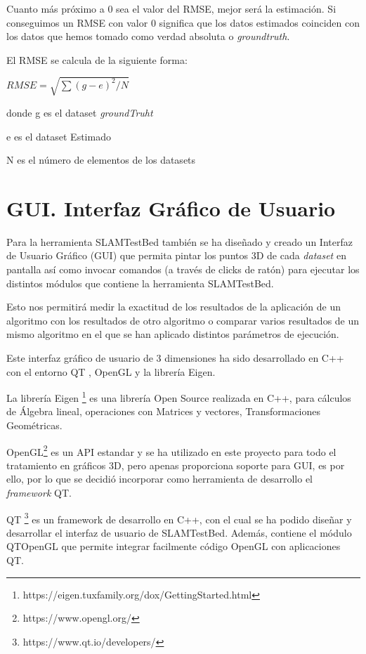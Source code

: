 Cuanto más próximo a 0 sea el valor del RMSE, mejor será la estimación. Si conseguimos un RMSE con valor 0 significa que los datos estimados coinciden con los datos que hemos tomado como verdad absoluta o \textit{groundtruth}.

El RMSE se calcula de la siguiente forma:
\begin{center}
\begin{math}
RMSE =\sqrt{\sum{( g - e)^2}/N}
\end{math}
\end{center}

donde g es el dataset \textit{groundTruht}

      e es el dataset Estimado

      N es el número de elementos de los datasets




\section{GUI. Interfaz Gráfico de Usuario}
Para la herramienta SLAMTestBed también se ha diseñado y creado un Interfaz de Usuario Gráfico (GUI) que permita pintar los puntos 3D de cada \textit{dataset} en pantalla así como invocar comandos (a través de clicks de ratón) para ejecutar los distintos módulos que contiene la herramienta SLAMTestBed.

Esto nos permitirá medir la exactitud de los resultados de la aplicación de un algoritmo con los resultados de otro algoritmo o comparar varios resultados de un mismo algoritmo en el que se han aplicado distintos parámetros de ejecución.

Este interfaz gráfico de usuario de 3 dimensiones ha sido desarrollado en C++ con el entorno QT , OpenGL y la librería Eigen. 

La librería Eigen \footnote{https://eigen.tuxfamily.org/dox/GettingStarted.html} es una librería Open Source realizada en C++, para cálculos de Álgebra lineal, operaciones con Matrices y vectores, Transformaciones Geométricas. 

OpenGL\footnote{https://www.opengl.org/} es un API estandar y se ha utilizado en este proyecto para todo el tratamiento en gráficos 3D, pero apenas proporciona soporte para GUI, es por ello, por lo que se decidió incorporar como herramienta de desarrollo el \textit{framework} QT. 

QT \footnote{https://www.qt.io/developers/} es un framework de desarrollo en C++, con el cual se ha podido diseñar y desarrollar el interfaz de usuario de SLAMTestBed. Además, contiene el módulo QTOpenGL que permite integrar facilmente código OpenGL con aplicaciones QT.

